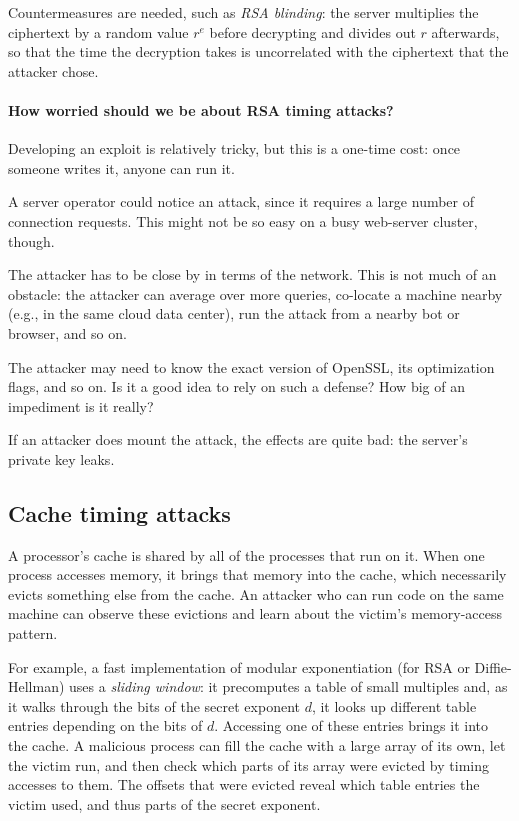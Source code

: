 Countermeasures are needed, such as \emph{RSA blinding}: the server
multiplies the ciphertext by a random value $r^e$ before decrypting and
divides out $r$ afterwards, so that the time the decryption takes is
uncorrelated with the ciphertext that the attacker chose.

\paragraph{How worried should we be about RSA timing attacks?}
\begin{compactitem}
  \item Developing an exploit is relatively tricky, but this is a
        one-time cost: once someone writes it, anyone can run it.
  \item A server operator could notice an attack, since it requires a
        large number of connection requests.
        This might not be so easy on a busy web-server cluster, though.
  \item The attacker has to be close by in terms of the network.
        This is not much of an obstacle: the attacker can average
        over more queries, co-locate a machine nearby (e.g., in the same
        cloud data center), run the attack from a nearby bot or browser,
        and so on.
  \item The attacker may need to know the exact version of OpenSSL,
        its optimization flags, and so on.
        Is it a good idea to rely on such a defense?
        How big of an impediment is it really?
  \item If an attacker does mount the attack, the effects are quite
        bad: the server's private key leaks.
\end{compactitem}

\subsection{Cache timing attacks}

A processor's cache is shared by all of the processes that run on it.
When one process accesses memory, it brings that memory into the cache,
which necessarily evicts something else from the cache.
An attacker who can run code on the same machine can observe these
evictions and learn about the victim's memory-access pattern.

For example, a fast implementation of modular exponentiation (for RSA
or Diffie-Hellman) uses a \emph{sliding window}: it precomputes a table
of small multiples and, as it walks through the bits of the secret
exponent $d$, it looks up different table entries depending on the
bits of $d$.
Accessing one of these entries brings it into the cache.
A malicious process can fill the cache with a large array of its own,
let the victim run, and then check which parts of its array were
evicted by timing accesses to them.
The offsets that were evicted reveal which table entries the victim
used, and thus parts of the secret exponent.

